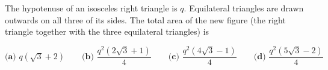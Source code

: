The hypotenuse of an isosceles right triangle is $q$. Equilateral triangles are drawn outwards on all three of its sides. The total area of the new figure (the right triangle together with the three equilateral triangles) is

$\textbf{(a) }q(\sqrt3+2)\qquad\textbf{(b) }\dfrac{q^2(2\sqrt3+1)}{4}\qquad\textbf{(c) }\dfrac{q^2(4\sqrt3-1)}{4}\qquad\textbf{(d) }\dfrac{q^2(5\sqrt3-2)}{4}$
